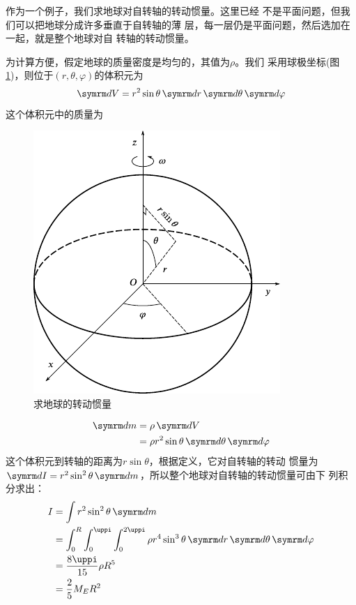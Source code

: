 作为一个例子，我们求地球对自转轴的转动惯量。这里已经
不是平面问题，但我们可以把地球分成许多垂直于自转轴的薄
层，每一层仍是平面问题，然后选加在一起，就是整个地球对自
转轴的转动惯量。

为计算方便，假定地球的质量密度是均匀的，其值为$ \rho $。我们
采用球极坐标(图\ref{fig:09.13})，则位于$ \left( r, \theta, \varphi \right) $的体积元为
\begin{equation*}
    \dif V = r ^ { 2 } \sin \theta \dif r \dif \theta \dif \varphi
\end{equation*}
这个体积元中的质量为

\begin{figure}[h]
    \centering
    \includegraphics{figure/fig09.13}
    \caption{求地球的转动惯量}
    \label{fig:09.13}
\end{figure}
\begin{equation*}
    \begin{split}
        \dif m &= \rho \dif V \\
        &= \rho r ^ { 2 } \sin \theta \dif \theta \dif \varphi
    \end{split}
\end{equation*}
这个体积元到转轴的距离为$ r \sin \theta  $，根据定义，它对自转轴的转动
惯量为$  \dif I = r ^ { 2 } \sin ^ { 2 } \theta \dif m   $，所以整个地球对自转轴的转动惯量可由下
列积分求出：
\begin{equation*}
    \begin{split}
        I &= \int  r ^ { 2 } \sin ^ { 2 } \theta \dif m \\
        &= \int _ 0 ^ { R } \int _ 0 ^ { \uppi } \int _ 0 ^ { 2 \uppi } \rho r ^ { 4 } \sin ^ { 3 } \theta \dif r \dif \theta \dif \varphi \\
        &= \frac { 8 \uppi } { 1 5 } \rho R ^ { 5 } \\
        &= \frac { 2 } { 5 } M _ { E } R ^ { 2 }
    \end{split}
\end{equation*}

